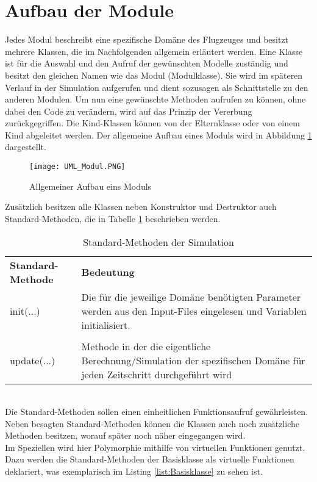 \section{Aufbau der Module}
\label{sec:AufbauModule}
Jedes Modul beschreibt eine spezifische Domäne des Flugzeuges und  besitzt mehrere Klassen, die im Nachfolgenden allgemein erläutert werden. Eine Klasse ist für die Auswahl und den Aufruf der gewünschten Modelle zuständig und besitzt den gleichen Namen wie das Modul (Modulklasse). Sie wird im späteren Verlauf in der Simulation aufgerufen und dient sozusagen als Schnittstelle zu den anderen Modulen. Um nun eine gewünschte Methoden aufrufen zu können, ohne dabei den Code zu verändern, wird auf das Prinzip der Vererbung  zurückgegriffen.  Die Kind-Klassen können von der Elternklasse oder von einem Kind abgeleitet werden. Der allgemeine Aufbau eines Moduls wird in Abbildung \ref{fig:UML_Modul} dargestellt.
 \begin{figure}[h]
 	 \centering\texttt{[image: UML\_Modul.PNG]}
 	 \caption{Allgemeiner Aufbau eins Moduls }
 	 \label{fig:UML_Modul}
 \end{figure} \newpage
Zusätzlich besitzen alle Klassen neben Konstruktor und Destruktor auch Standard-Methoden, die in Tabelle \ref{tab:Standardmethoden} beschrieben werden.\\
\begin{table}[h]
	\centering	\begin{tabular}{l p{10cm}}
		\textbf{Standard-Methode} & \textbf{Bedeutung}\\
		init(...) & Die für die jeweilige Domäne benötigten Parameter werden aus den Input-Files eingelesen und Variablen initialisiert.\\\\
		update(...) & Methode in der die eigentliche Berechnung/Simulation der spezifischen Domäne für jeden Zeitschritt durchgeführt wird
	\end{tabular}
	\caption{Standard-Methoden der Simulation}
	\label{tab:Standardmethoden}
\end{table}\\
Die Standard-Methoden sollen einen einheitlichen Funktionsaufruf gewährleisten. Neben besagten Standard-Methoden können die Klassen auch noch zusätzliche Methoden besitzen, worauf später noch näher eingegangen wird. \\
Im Speziellen wird hier Polymorphie mithilfe von virtuellen Funktionen genutzt. Dazu werden die Standard-Methoden der Basisklasse als virtuelle Funktionen deklariert, was exemplarisch im Listing \ref{list:Basisklasse} zu sehen ist.

